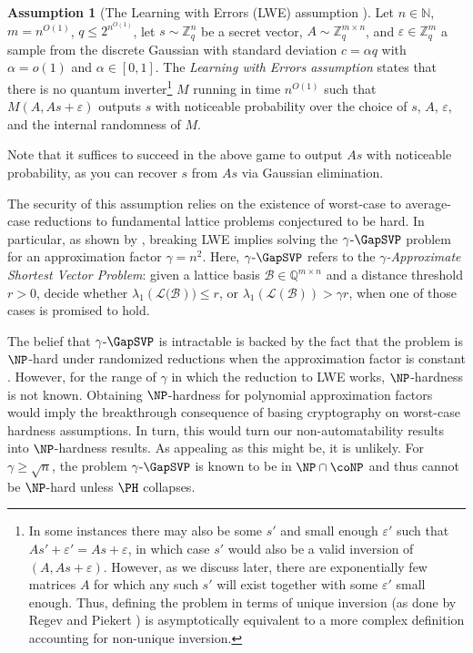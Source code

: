 \documentclass[11pt]{article}
\newcommand{\gammaGSVP}{\gamma\text{-}\GapSVP}
\theoremstyle{definition}
\newtheorem{assumption}[definition]{Assumption}
\theoremstyle{plain}
\theoremstyle{remark}
\newcommand{\cB}{\mathcal{B}}
\newcommand{\bZ}{\mathbb{Z}}
\newcommand{\bN}{\mathbb{N}}
\begin{document}
\begin{assumption}[The Learning with Errors (LWE) assumption \cite{regev2009lattices, peikert2016decade}]
\label{ass:lwe}
    Let $n \in \bN$, $m = n^{O(1)}$, $q \leq 2^{n^{O(1)}}$, let $s \sim \bZ_q^n$ be a secret vector, $A \sim \bZ_q^{m \times n}$, and $\varepsilon \in \bZ_q^m$ a sample from the discrete Gaussian with standard deviation $c = \alpha q$ with $\alpha = o(1)$ and $\alpha \in [0,1]$. The \emph{Learning with Errors assumption} states that there is no quantum inverter\footnote{In some instances there may also be some $s'$ and small enough
    $\varepsilon'$ such that  $As'+ \varepsilon' = As+\varepsilon$, in which case $s'$ would 
    also be a valid inversion of $(A,As+\varepsilon)$. However, as we discuss later, there are exponentially few matrices $A$ for which any such $s'$ will exist together with some 
    $\varepsilon'$ small enough. Thus, defining the problem in terms of unique inversion (as done by Regev \cite{regev2009lattices} and Piekert \cite{peikert2016decade}) is asymptotically equivalent to a more complex definition accounting for non-unique inversion.
    } $M$ running in time $n^{O(1)}$ such that $M(A, As+ \varepsilon)$ outputs $s$ 
    with noticeable probability
    over the choice of $s$, $A$, $\varepsilon$, and the internal randomness of $M$.
\end{assumption}

Note that it suffices to succeed in the above game to output $As$ with noticeable probability, as you can recover $s$ from $As$ via Gaussian elimination.

The security of this assumption relies on the existence of worst-case to average-case reductions to fundamental lattice problems conjectured to be hard. In particular, as shown by \citeauthor{regev2009lattices} \cite{regev2009lattices}, breaking LWE implies solving the $\gammaGSVP$ problem for an approximation factor $\gamma = n^2$. Here, $\gammaGSVP$ refers to the \emph{$\gamma$-Approximate Shortest Vector Problem}: given a lattice basis $\mathcal{B}\in\mathbb{Q}^{m\times n}$ and a distance threshold $r>0$, decide whether $\lambda_1(\mathcal{L(\cB}))\leq r$, or
$\lambda_1 (\mathcal{L(\cB)})>\gamma r$, when one of those cases is promised to hold.

The belief that $\gammaGSVP$ is intractable is backed by the fact that the problem is $\NP$-hard under randomized reductions when the approximation factor is constant \cite{ajtai1996generating,peikert2016decade, BP2022}. However, for the range of $\gamma$ in which the reduction to LWE works, $\NP$-hardness is not known. Obtaining $\NP$-hardness for polynomial approximation factors would imply the breakthrough consequence of basing cryptography on worst-case hardness assumptions. In turn, this would turn our non-automatability results into $\NP$-hardness results. As appealing as this might be, it is unlikely. For $\gamma \geq \sqrt{n}$, the problem $\gammaGSVP$ is known to be in $\NP \cap \coNP$ \cite{NPcoNP} and thus cannot be $\NP$-hard unless $\PH$ collapses.
\end{document}
